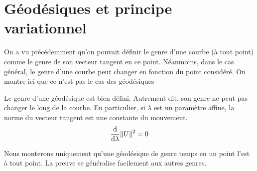 \section{Géodésiques et principe variationnel}
On a vu précédemment qu'on pouvait définir le genre d'une courbe (à tout point) comme le genre de son vecteur tangent en ce point. Néanmoins, dans le cas général, le genre d'une courbe peut changer en fonction du point considéré. On montre ici que ce n'est pas le cas des géodésiques
\begin{theoremframe}
    \begin{propri}
        Le genre d'une géodésique est bien défini. Autrement dit, son genre ne peut pas changer le long de la courbe. En particulier, si $\lambda$ est un paramètre affine, la norme du vecteur tangent est une constante du mouvement.
        \begin{equation}
            \frac{\mathrm{d}}{\mathrm{d}\lambda}\lVert U \rVert^2 = 0
        \end{equation}
    \end{propri}
\end{theoremframe}
Nous monterons uniquement qu'une géodésique de genre temps en un point l'est à tout point. La preuve se généralise facilement aux autres genres.
